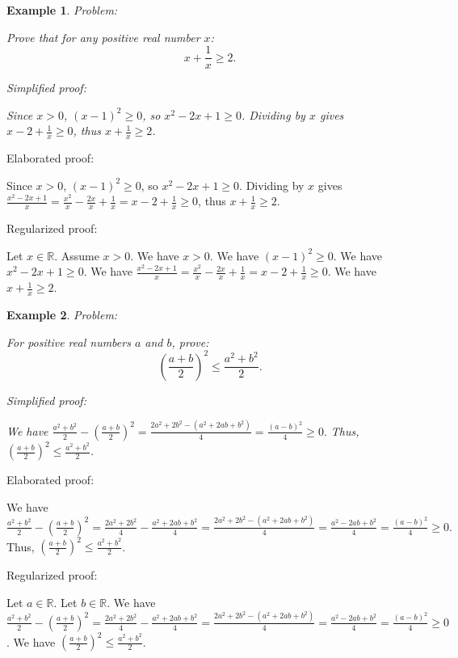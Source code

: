 \documentclass{article}
\newtheorem{example}{Example}
\begin{document}
\begin{example}
Problem:
\begin{tcolorbox}[colback=yellow!10, width=\linewidth]
Prove that for any positive real number $x$:
    $$x + \frac{1}{x} \geq 2.$$
\end{tcolorbox}

Simplified proof:
\begin{tcolorbox}[colback=blue!10, width=\linewidth]
Since $x>0$, $(x-1)^2 \ge 0$, so $x^2 - 2x + 1 \ge 0$. Dividing by $x$ gives $x - 2 + \frac{1}{x} \ge 0$, thus $x + \frac{1}{x} \ge 2$.
\end{tcolorbox}
\end{example}

Elaborated proof:
\begin{tcolorbox}[colback=green!10, width=\linewidth]
Since $x>0$, $(x-1)^2 \ge 0$, so $x^2 - 2x + 1 \ge 0$. Dividing by $x$ gives $\frac{x^2 - 2x + 1}{x} = \frac{x^2}{x} - \frac{2x}{x} + \frac{1}{x} = x - 2 + \frac{1}{x} \ge 0$, thus $x + \frac{1}{x} \ge 2$.
\end{tcolorbox}

Regularized proof:
\begin{tcolorbox}[colback=red!10, width=\linewidth]
Let $x\in\mathbb{R}$. Assume $x > 0$.
We have $x > 0$. We have $(x-1)^2 \ge 0$. We have $x^2 - 2x + 1 \ge 0$. We have $\frac{x^2 - 2x + 1}{x} = \frac{x^2}{x} - \frac{2x}{x} + \frac{1}{x} = x - 2 + \frac{1}{x} \ge 0$. We have $x + \frac{1}{x} \ge 2$.
\end{tcolorbox}



\begin{example}
Problem:
\begin{tcolorbox}[colback=yellow!10, width=\linewidth]
For positive real numbers $a$ and $b$, prove:
    $$\left(\frac{a+b}{2}\right)^2 \leq \frac{a^2+b^2}{2}.$$
\end{tcolorbox}

Simplified proof:
\begin{tcolorbox}[colback=blue!10, width=\linewidth]
We have
$ \frac{a^2+b^2}{2} - \left(\frac{a+b}{2}\right)^2 = \frac{2a^2+2b^2-(a^2+2ab+b^2)}{4} = \frac{(a-b)^2}{4} \ge 0. $
Thus, $\left(\frac{a+b}{2}\right)^2 \leq \frac{a^2+b^2}{2}$.
\end{tcolorbox}
\end{example}

Elaborated proof:
\begin{tcolorbox}[colback=green!10, width=\linewidth]
We have
$ \frac{a^2+b^2}{2} - \left(\frac{a+b}{2}\right)^2 = \frac{2a^2+2b^2}{4} - \frac{a^2+2ab+b^2}{4} = \frac{2a^2+2b^2-(a^2+2ab+b^2)}{4} = \frac{a^2-2ab+b^2}{4} = \frac{(a-b)^2}{4} \ge 0. $
Thus, $\left(\frac{a+b}{2}\right)^2 \leq \frac{a^2+b^2}{2}$.
\end{tcolorbox}

Regularized proof:
\begin{tcolorbox}[colback=red!10, width=\linewidth]
Let $a\in\mathbb{R}$.
Let $b\in\mathbb{R}$.
We have $\frac{a^2+b^2}{2} - \left(\frac{a+b}{2}\right)^2 = \frac{2a^2+2b^2}{4} - \frac{a^2+2ab+b^2}{4} = \frac{2a^2+2b^2-(a^2+2ab+b^2)}{4} = \frac{a^2-2ab+b^2}{4} = \frac{(a-b)^2}{4} \ge 0$.
We have $\left(\frac{a+b}{2}\right)^2 \leq \frac{a^2+b^2}{2}$.
\end{tcolorbox}
\end{document}
